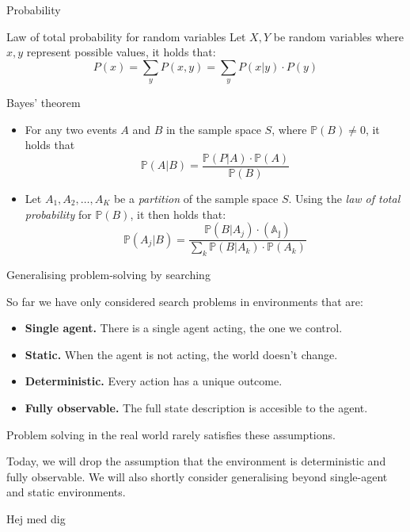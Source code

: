 \documentclass[aspectratio=169,hyperref={pdfpagelabels=false}]{beamer}
\begin{document}
\begin{frame}[allowframebreaks]{Probability}
    \begin{block}{Law of total probability for random variables}
    Let \(X,Y\) be random variables where \(x,y\) represent possible values, it holds that:
    \[
        P(x) = \sum_y P(x,y) = \sum_y P(x|y)\cdot P(y)
    \]
    \end{block}
    \framebreak
    
    
    \begin{block}{Bayes' theorem}
    \begin{itemize}
        \item For any two events \(A\) and \(B\) in the sample space \(S\), where \(\mathds{P}(B) \neq 0\), it holds that
        \[\mathds{P}(A|B) = \frac{\mathds{P}(P|A) \cdot \mathds{P}(A)}{\mathds{P}(B)}\]
        \item Let \(A_1, A_2, \dots , A_K\) be a \textit{partition} of the sample space \(S\). Using the \textit{law of total probability} for \(\mathds{P}(B)\), it then holds that:
        \[
            \mathds{P}(A_j | B) = \frac{\mathds{P}(B|A_j) \cdot \mathds{(A_j)}}{\sum_k \mathds{P}(B|A_k) \cdot \mathds{P}(A_k)}
        \]
    \end{itemize}
    \end{block}
\end{frame}

\begin{frame}{Generalising problem-solving by searching}

So far we have only considered search problems in environments that are:
\begin{itemize}
    \item \textbf{Single agent.} There is a single agent acting, the one we control.
    \item \textbf{Static.} When the agent is not acting, the world doesn't change.
    \item \textbf{Deterministic.} Every action has a unique outcome.
    \item \textbf{Fully observable.} The full state description is accesible to the agent.
\end{itemize}
Problem solving in the real world rarely satisfies these assumptions.

Today, we will drop the assumption that the environment is deterministic and fully observable. We will also shortly consider generalising beyond single-agent and static environments.

\end{frame}

\begin{frame}{Hej}
    med dig
\end{frame}
\end{document}

